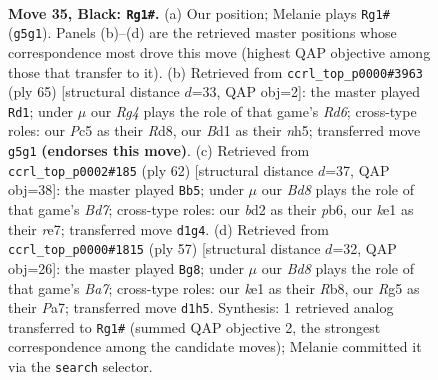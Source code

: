\documentclass[11pt]{article}
\begin{document}
\clearpage

\begin{figure}[p]\centering
\begin{subfigure}{0.46\textwidth}\centering
\resizebox{\linewidth}{!}{%
\newchessgame
\chessboard[
  setfen={5r2/pp4k1/8/2p3r1/4p3/N3P3/PP1B4/R2bK3 b - - 5 35},
  showmover=false,
  pgfstyle=straightmove, color=movearrow, markmove={g5-g1}
]}
\caption{}
\end{subfigure}\hfill
\begin{subfigure}{0.46\textwidth}\centering
\resizebox{\linewidth}{!}{%
\newchessgame
\chessboard[
  setfen={3r4/pp3p1k/2p4p/4B2N/7P/1P1r4/P5PK/R7 b - - 0 33},
  showmover=false,
  pgfstyle=straightmove, color=movearrow, markmove={d3-d1}
]}
\caption{}
\end{subfigure}
\\[4pt]
\begin{subfigure}{0.46\textwidth}\centering
\resizebox{\linewidth}{!}{%
\newchessgame
\chessboard[
  setfen={8/2kBrppp/1p5n/8/5P2/6P1/P6P/3R3K w - - 1 32},
  showmover=false,
  pgfstyle=straightmove, color=movearrow, markmove={d7-b5}
]}
\caption{}
\end{subfigure}\hfill
\begin{subfigure}{0.46\textwidth}\centering
\resizebox{\linewidth}{!}{%
\newchessgame
\chessboard[
  setfen={1r5k/pN4pp/8/4P3/3n4/6P1/b3P1BP/R6K b - - 2 29},
  showmover=false,
  pgfstyle=straightmove, color=movearrow, markmove={a2-g8}
]}
\caption{}
\end{subfigure}
\caption{\textbf{Move 35, Black: \texttt{Rg1\#}.} (a) Our position; Melanie plays \texttt{Rg1\#} (\texttt{g5g1}). Panels (b)--(d) are the retrieved master positions whose correspondence most drove this move (highest QAP objective among those that transfer to it). (b) Retrieved from \texttt{ccrl\_top\_p0000\#3963} (ply 65) [structural distance $d$=33, QAP obj=2]: the master played \texttt{Rd1}; under $\mu$ our \emph{Rg4} plays the role of that game's \emph{Rd6}; cross-type roles: our \emph{P}c5 as their \emph{R}d8, our \emph{B}d1 as their \emph{n}h5; transferred move \texttt{g5g1} \textbf{(endorses this move)}. (c) Retrieved from \texttt{ccrl\_top\_p0002\#185} (ply 62) [structural distance $d$=37, QAP obj=38]: the master played \texttt{Bb5}; under $\mu$ our \emph{Bd8} plays the role of that game's \emph{Bd7}; cross-type roles: our \emph{b}d2 as their \emph{p}b6, our \emph{k}e1 as their \emph{r}e7; transferred move \texttt{d1g4}. (d) Retrieved from \texttt{ccrl\_top\_p0000\#1815} (ply 57) [structural distance $d$=32, QAP obj=26]: the master played \texttt{Bg8}; under $\mu$ our \emph{Bd8} plays the role of that game's \emph{Ba7}; cross-type roles: our \emph{k}e1 as their \emph{R}b8, our \emph{R}g5 as their \emph{P}a7; transferred move \texttt{d1h5}. Synthesis: 1 retrieved analog transferred to \texttt{Rg1\#} (summed QAP objective 2, the strongest correspondence among the candidate moves); Melanie committed it via the \texttt{search} selector.}
\label{fig:thought-m69}
\end{figure}
\end{document}
